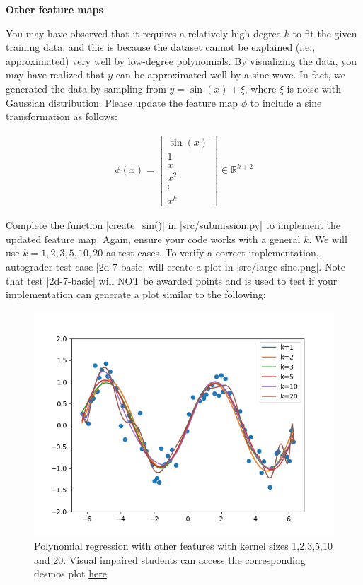 \item {} {\bf Other feature maps}

You may have observed that it requires a relatively high degree $k$ to fit the given training data, and this is because the dataset cannot be explained (i.e., approximated) very well by low-degree polynomials. By visualizing the data, you may have realized that $y$ can be approximated well by a sine wave. In fact, we generated the data by sampling from $y = \sin(x) + \xi$, where $\xi$ is noise with Gaussian distribution. Please update the feature map $\phi$ to include a sine transformation as follows:

\begin{align}
\phi(x) = \left[\begin{array}{c} \sin(x) \\ 1 \\ x \\ x^2\\ \vdots \\x^k\end{array}\right]\in \mathbb{R}^{k+2} \label{eqn:feature-sine}
\end{align}

Complete the function |create_sin()| in |src/submission.py| to implement the updated feature map.  Again, ensure your code  works with a general $k$.  We will use $k=1,2,3,5,10,20$ as test cases. To verify a correct implementation, autograder test case |2d-7-basic| will create a plot in |src/large-sine.png|. Note that test |2d-7-basic| will NOT be awarded points and is used to test if your implementation can generate a plot similar to the following:

\begin{figure}[H]
  \centering
  \includegraphics[width=0.65\linewidth]{02-featuremaps/large-sine.png}
  \centering
\caption{Polynomial regression with other features with kernel sizes 1,2,3,5,10 and 20. Visual impaired students can access the corresponding desmos plot \href{https://www.desmos.com/calculator/ikkytcrqyp}{here}}
\end{figure}
